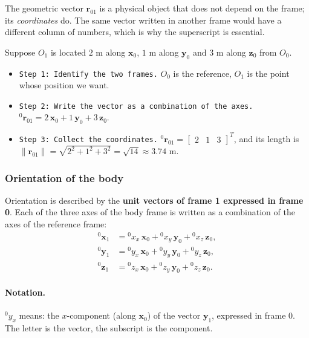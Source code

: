 The geometric vector $\mathbf{r}_{01}$ is a physical object that does not depend on the frame; its \emph{coordinates} do. The same vector written in another frame would have a different column of numbers, which is why the superscript is essential.

\begin{example}
Suppose $O_1$ is located $2$ m along $\mathbf{x}_0$, $1$ m along $\mathbf{y}_0$ and $3$ m along $\mathbf{z}_0$ from $O_0$.
\begin{itemize}
    \item \texttt{Step 1: Identify the two frames.} $O_0$ is the reference, $O_1$ is the point whose position we want.
    \vspace{0.2cm}
    \item \texttt{Step 2: Write the vector as a combination of the axes.} ${}^0\mathbf{r}_{01}=2\,\mathbf{x}_0+1\,\mathbf{y}_0+3\,\mathbf{z}_0$.
    \vspace{0.2cm}
    \item \texttt{Step 3: Collect the coordinates.} ${}^0\mathbf{r}_{01}=\begin{bmatrix}2&1&3\end{bmatrix}^T$, and its length is $\|\mathbf{r}_{01}\|=\sqrt{2^2+1^2+3^2}=\sqrt{14}\approx 3.74$ m.
\end{itemize}
\end{example}

\subsubsection{Orientation of the body}
\label{Orientation of the body}

Orientation is described by the \textbf{unit vectors of frame 1 expressed in frame 0}. Each of the three axes of the body frame is written as a combination of the axes of the reference frame:
\begin{align*}
{}^0\mathbf{x}_1 &= {}^0x_x\,\mathbf{x}_0+{}^0x_y\,\mathbf{y}_0+{}^0x_z\,\mathbf{z}_0,\\
{}^0\mathbf{y}_1 &= {}^0y_x\,\mathbf{x}_0+{}^0y_y\,\mathbf{y}_0+{}^0y_z\,\mathbf{z}_0,\\
{}^0\mathbf{z}_1 &= {}^0z_x\,\mathbf{x}_0+{}^0z_y\,\mathbf{y}_0+{}^0z_z\,\mathbf{z}_0.
\end{align*}

\paragraph{Notation.} ${}^0y_x$ means: the $x$-component (along $\mathbf{x}_0$) of the vector $\mathbf{y}_1$, expressed in frame 0. The letter is the vector, the subscript is the component.

